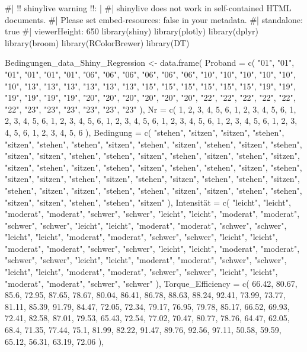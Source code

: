 \documentclass[
  letterpaper,
  DIV=11]{scrartcl}
\newenvironment{Shaded}{\begin{snugshade}}{\end{snugshade}}
\newcommand{\NormalTok}[1]{\textcolor[rgb]{0.00,0.23,0.31}{#1}}
\begin{document}
\begin{Shaded}
\begin{Highlighting}[]
\NormalTok{\#| \textquotesingle{}!! shinylive warning !!\textquotesingle{}: |}
\NormalTok{\#|   shinylive does not work in self{-}contained HTML documents.}
\NormalTok{\#|   Please set \textasciigrave{}embed{-}resources: false\textasciigrave{} in your metadata.}
\NormalTok{\#| standalone: true}
\NormalTok{\#| viewerHeight: 650}
\NormalTok{library(shiny)}
\NormalTok{library(plotly)}
\NormalTok{library(dplyr)}
\NormalTok{library(broom)}
\NormalTok{library(RColorBrewer)}
\NormalTok{library(DT)}

\NormalTok{Bedingungen\_data\_Shiny\_Regression \textless{}{-} data.frame(}
\NormalTok{  \textasciigrave{}Proband\textasciigrave{} = c( "01", "01", "01", "01", "01", "01", "06", "06", "06", "06", "06", "06", "10", "10", "10", "10", "10", "10", "13", "13", "13", "13", "13", "13", "15", "15", "15", "15", "15", "15", "19", "19", "19", "19", "19", "19", "20", "20", "20", "20", "20", "20", "22", "22", "22", "22", "22", "22", "23", "23", "23", "23", "23", "23" ),}
\NormalTok{  \textasciigrave{}Nr\textasciigrave{} = c( 1, 2, 3, 4, 5, 6, 1, 2, 3, 4, 5, 6, 1, 2, 3, 4, 5, 6, 1, 2, 3, 4, 5, 6, 1, 2, 3, 4, 5, 6, 1, 2, 3, 4, 5, 6, 1, 2, 3, 4, 5, 6, 1, 2, 3, 4, 5, 6, 1, 2, 3, 4, 5, 6 ),}
\NormalTok{  \textasciigrave{}Bedingung\textasciigrave{} = c( "stehen", "sitzen", "sitzen", "stehen", "sitzen", "stehen", "stehen", "sitzen", "stehen", "sitzen", "stehen", "sitzen", "stehen", "sitzen", "sitzen", "stehen", "stehen", "sitzen", "stehen", "sitzen", "stehen", "sitzen", "sitzen", "stehen", "sitzen", "stehen", "sitzen", "stehen", "stehen", "sitzen", "stehen", "sitzen", "sitzen", "stehen", "sitzen", "stehen", "sitzen", "stehen", "stehen", "sitzen", "stehen", "sitzen", "sitzen", "stehen", "stehen", "sitzen", "sitzen", "stehen", "stehen", "sitzen", "sitzen", "stehen", "stehen", "sitzen" ),}
\NormalTok{  \textasciigrave{}Intensität\textasciigrave{} = c( "leicht", "leicht", "moderat", "moderat", "schwer", "schwer", "leicht", "leicht", "moderat", "moderat", "schwer", "schwer", "leicht", "leicht", "moderat", "moderat", "schwer", "schwer", "leicht", "leicht", "moderat", "moderat", "schwer", "schwer", "leicht", "leicht", "moderat", "moderat", "schwer", "schwer", "leicht", "leicht", "moderat", "moderat", "schwer", "schwer", "leicht", "leicht", "moderat", "moderat", "schwer", "schwer", "leicht", "leicht", "moderat", "moderat", "schwer", "schwer", "leicht", "leicht", "moderat", "moderat", "schwer", "schwer" ),}
\NormalTok{  \textasciigrave{}Torque\_Efficiency\textasciigrave{} = c( 66.42, 80.67, 85.6, 72.95, 87.65, 78.67, 80.04, 86.41, 86.78, 88.63, 88.24, 92.41, 73.99, 73.77, 81.11, 85.39, 91.79, 84.47, 72.05, 72.34, 79.17, 76.95, 79.78, 85.17, 66.52, 69.93, 72.41, 82.58, 87.01, 79.53, 65.43, 72.54, 77.02, 70.47, 80.77, 78.76, 64.47, 62.05, 68.4, 71.35, 77.44, 75.1, 81.99, 82.22, 91.47, 89.76, 92.56, 97.11, 50.58, 59.59, 65.12, 56.31, 63.19, 72.06 ),}

\end{Highlighting}
\end{Shaded}
\end{document}
